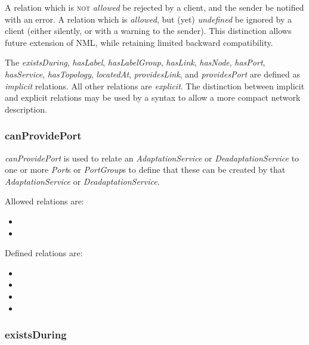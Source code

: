 A relation which is \textsc{not} \emph{allowed} \MUST{} be rejected by a client, and the sender \SHOULD{} be notified with an error.
A relation which is \emph{allowed}, but (yet) \emph{undefined} \SHOULD{} be ignored by a client (either silently, or with a warning to the sender).
This distinction allows future extension of NML, while retaining limited backward compatibility.

The \emph{existsDuring}, \emph{hasLabel}, \emph{hasLabelGroup}, \emph{hasLink}, 
\emph{hasNode}, \emph{hasPort}, \emph{hasService}, \emph{hasTopology}, 
\emph{locatedAt}, \emph{providesLink}, and \emph{providesPort} are defined as 
\emph{implicit} relations. All other relations are \emph{explicit}. 
The distinction between implicit and explicit relations may be used by a syntax to 
allow a more compact network description.

\subsubsection{canProvidePort}%
\label{rel:canProvidePort}

\emph{canProvidePort} is used to relate an \emph{AdaptationService} or 
\emph{DeadaptationService} to one or more \emph{Port}s or \emph{PortGroup}s 
to define that these can be created by that \emph{AdaptationService} or 
\emph{DeadaptationService}.

Allowed relations are:
\begin{itemize}
    \item {}
    \item {}
\end{itemize}

Defined relations are:
\begin{itemize}
    \item {}
    \item {}
    \item {}
    \item {}
\end{itemize}

\subsubsection{existsDuring}%
\label{rel:existsDuring}


